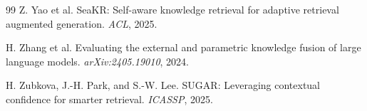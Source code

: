 \documentclass[10pt,letterpaper]{article}
\begin{document}
\begin{thebibliography}{99}
Z. Yao et al.
{SeaKR}: Self-aware knowledge retrieval for adaptive retrieval augmented generation.
\emph{ACL}, 2025.

H. Zhang et al.
Evaluating the external and parametric knowledge fusion of large language models.
\emph{arXiv:2405.19010}, 2024.

H. Zubkova, J.-H. Park, and S.-W. Lee.
{SUGAR}: Leveraging contextual confidence for smarter retrieval.
\emph{ICASSP}, 2025.

\end{thebibliography}
\end{document}
